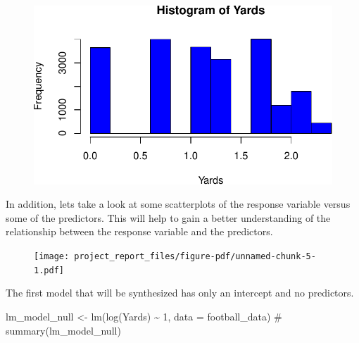 \documentclass[
  super,
  preprint,
  3p]{elsarticle}
\newenvironment{Shaded}{\begin{snugshade}}{\end{snugshade}}
\newcommand{\AttributeTok}[1]{\textcolor[rgb]{0.40,0.45,0.13}{#1}}
\newcommand{\CommentTok}[1]{\textcolor[rgb]{0.37,0.37,0.37}{#1}}
\newcommand{\DecValTok}[1]{\textcolor[rgb]{0.68,0.00,0.00}{#1}}
\newcommand{\FunctionTok}[1]{\textcolor[rgb]{0.28,0.35,0.67}{#1}}
\newcommand{\NormalTok}[1]{\textcolor[rgb]{0.00,0.23,0.31}{#1}}
\newcommand{\OtherTok}[1]{\textcolor[rgb]{0.00,0.23,0.31}{#1}}
\newcommand{\SpecialCharTok}[1]{\textcolor[rgb]{0.37,0.37,0.37}{#1}}
\begin{document}
\begin{figure}[H]

{\centering \includegraphics{project_report_files/figure-pdf/unnamed-chunk-4-1.pdf}

}

\end{figure}

In addition, lets take a look at some scatterplots of the response
variable versus some of the predictors. This will help to gain a better
understanding of the relationship between the response variable and the
predictors.

\begin{Shaded}
\end{Shaded}

\begin{figure}[H]

{\centering \texttt{[image: project\_report\_files/figure-pdf/unnamed-chunk-5-1.pdf]}

}

\end{figure}

The first model that will be synthesized has only an intercept and no
predictors.

\begin{Shaded}
\begin{Highlighting}[]
\NormalTok{lm\_model\_null }\OtherTok{\textless{}{-}} \FunctionTok{lm}\NormalTok{(}\FunctionTok{log}\NormalTok{(Yards) }\SpecialCharTok{\textasciitilde{}} \DecValTok{1}\NormalTok{, }\AttributeTok{data =}\NormalTok{ football\_data)}
\CommentTok{\# summary(lm\_model\_null)}
\end{Highlighting}
\end{Shaded}
\end{document}
